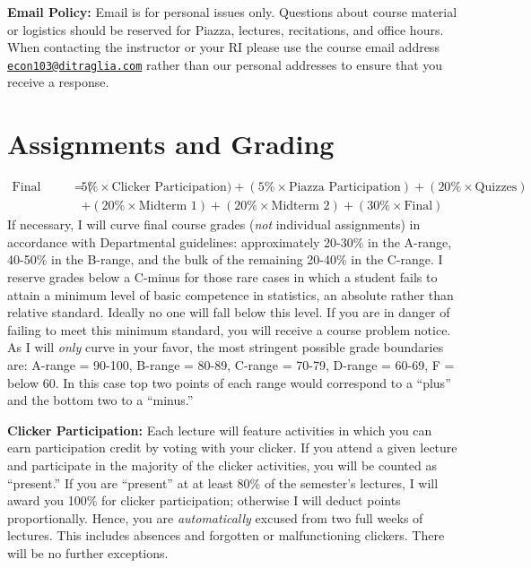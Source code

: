 \documentclass[11pt, letterpaper]{article}
\begin{document}
\bigskip

\noindent \textbf{Email Policy:} 
Email is for personal issues only. Questions about course material or logistics should be reserved for Piazza, lectures, recitations, and office hours. 
When contacting the instructor or your RI please use the course email address \href{mailto:econ103@ditraglia.com}{\texttt{econ103@ditraglia.com}} rather than our personal addresses to ensure that you receive a response.

\newpage

\section*{Assignments and Grading}
	\begin{equation*}
	\begin{split}
		\mbox{Final Grade} = (&5\% \times \mbox{Clicker Participation}) + (5\% \times \mbox{Piazza Participation}) + (20\% \times \mbox{Quizzes})  \\ &
							 + (20\% \times \mbox{Midterm 1}) + (20\% \times \mbox{Midterm 2}) + (30\% \times \mbox{Final})
	\end{split}
	\end{equation*}
If necessary, I will curve final course grades (\emph{not} individual assignments) in accordance with Departmental guidelines: approximately 20-30\% in the A-range, 40-50\% in the B-range, and the bulk of the remaining 20-40\% in the C-range. 
I reserve grades below a C-minus for those rare cases in which a student fails to attain a minimum level of basic competence in statistics, an absolute rather than relative standard. 
Ideally no one will fall below this level. 
If you are in danger of failing to meet this minimum standard, you will receive a course problem notice.
As I will \emph{only} curve in your favor, the most stringent possible grade boundaries are: A-range = 90-100, B-range = 80-89, C-range = 70-79, D-range = 60-69, F = below 60. 
In this case top two points of each range would correspond to a ``plus'' and the bottom two to a ``minus.'' 

\medskip


\noindent \textbf{Clicker Participation:} 
Each lecture will feature activities in which you can earn participation credit by voting with your clicker. 
If you attend a given lecture and participate in the majority of the clicker activities, you will be counted as ``present.'' 
If you are ``present'' at at least 80\% of the semester's lectures, I will award you 100\% for clicker participation; otherwise I will deduct points proportionally. 
Hence, you are \emph{automatically} excused from two full weeks of lectures. 
This includes absences and forgotten or malfunctioning clickers. There will be no further exceptions.
\end{document}
